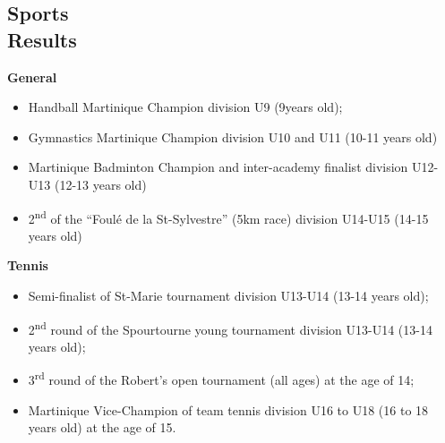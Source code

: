 \documentclass[margin]{res}
\begin{document}
\begin{resume}
  


  \section{Sports \\Results}
  
  {\bf General}
  \begin{itemize} \itemsep -2pt %
  \item Handball Martinique Champion division U9 (9years old);
  \item Gymnastics Martinique Champion division U10 and U11 (10-11 years old)
  \item Martinique Badminton Champion and inter-academy finalist division U12-U13 (12-13 years old)
  \item 2\textsuperscript{nd} of the ``Foul\'e de la St-Sylvestre'' (5km race) division U14-U15 (14-15 years old)
  \end{itemize}

  {\bf Tennis}
  \begin{itemize} \itemsep -2pt %

  \item Semi-finalist of St-Marie tournament division U13-U14 (13-14 years old);
  \item 2\textsuperscript{nd} round of the Spourtourne young tournament division U13-U14 (13-14 years old);
  \item 3\textsuperscript{rd} round of the Robert’s open tournament (all ages) at the age of 14;
  \item Martinique Vice-Champion of team tennis division U16 to U18 (16 to 18 years old) at the age of 15.
  \end{itemize}


\end{resume} 
\end{document}
